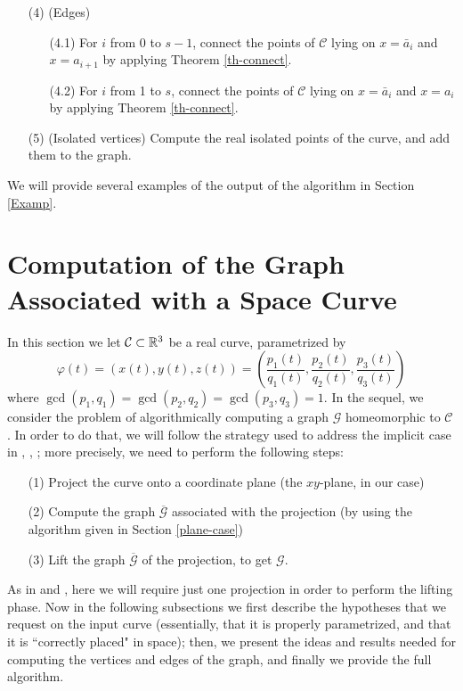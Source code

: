 \documentclass{elsart}
\begin{document}
\begin{itemize}
\begin{itemize}
        \end{itemize}
    \item [(4)] (Edges)
    \begin{itemize}
    \item [(4.1)] For $i$ from 0 to $s-1$, connect the points of ${\mathcal C}$ lying on $x=\bar{a}_i$ and $x=a_{i+1}$ by applying Theorem \ref{th-connect}.
        \item [(4.2)] For $i$ from 1 to $s$, connect the points of ${\mathcal C}$ lying on $x=\bar{a}_i$ and $x=a_i$ by applying Theorem \ref{th-connect}.
            \end{itemize}
            \item [(5)] (Isolated vertices) Compute the real isolated points of the curve, and add them to the graph.
\end{itemize}

We will provide several examples of the output of the algorithm in Section \ref{Examp}.


\section{Computation of the Graph Associated with a Space Curve}\label{sec-space}

In this section we let ${\mathcal C}\subset {\Bbb R}^3$ be a real curve, parametrized by
\[\varphi(t)=(x(t),y(t),z(t))=\left(\displaystyle{\frac{p_1(t)}{q_1(t)}},\displaystyle{\frac{p_2(t)}{q_2(t)}},\displaystyle{\frac{p_3(t)}{q_3(t)}}\right)\]
where $\gcd(p_1,q_1)=\gcd(p_2,q_2)=\gcd(p_3,q_3)=1$. In the sequel, we consider the problem of algorithmically computing a graph ${\mathcal G}$ homeomorphic to ${\mathcal C}$. In order to do that, we will follow the strategy used to address the implicit case in \cite{JG-Sendra}, \cite{Diat}, \cite{ElKa}; more precisely, we need to perform the following steps:
\begin{itemize}
\item [(1)] Project the curve onto a coordinate plane (the $xy$-plane, in our case)
 \item [(2)] Compute the graph $\overline{\mathcal G}$ associated with the projection (by using the algorithm given in Section \ref{plane-case})
     \item [(3)] Lift the graph $\overline{\mathcal G}$ of the projection, to get ${\mathcal G}$.
     \end{itemize}
     As in \cite{Diat} and \cite{ElKa}, here we will require just one projection
     in order to perform the lifting phase. Now in the following subsections we first describe the hypotheses that we request on the input curve (essentially, that it is properly parametrized, and that it is ``correctly placed" in space); then, we present the ideas and results needed for computing the vertices and edges of the graph, and finally we provide the full algorithm.
\end{document}
